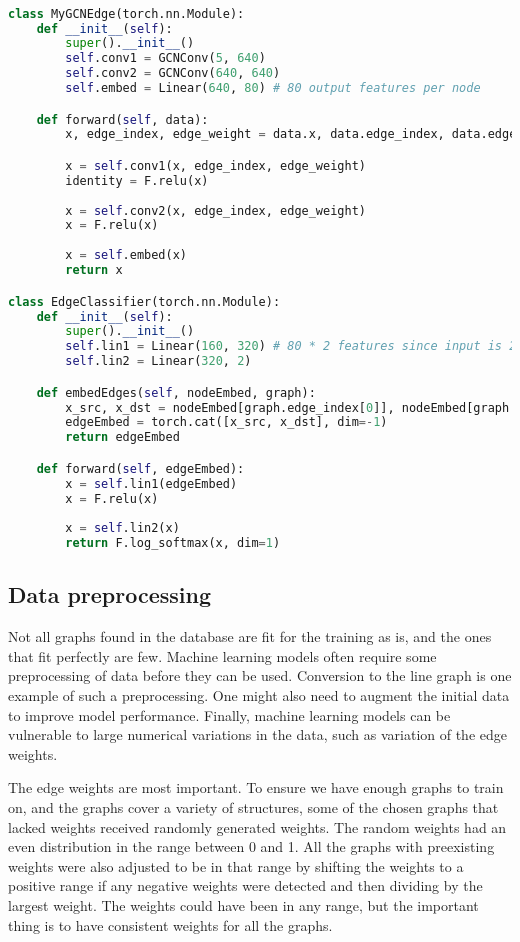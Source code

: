 \begin{lstlisting}[caption={Pytorch GCN for the edge classification}, label={Pytorch GCN for the edge prediction}, language=Python]

class MyGCNEdge(torch.nn.Module):
    def __init__(self):
        super().__init__()
        self.conv1 = GCNConv(5, 640)
        self.conv2 = GCNConv(640, 640)
        self.embed = Linear(640, 80) # 80 output features per node

    def forward(self, data):        
        x, edge_index, edge_weight = data.x, data.edge_index, data.edge_weight

        x = self.conv1(x, edge_index, edge_weight)
        identity = F.relu(x)
        
        x = self.conv2(x, edge_index, edge_weight)
        x = F.relu(x)
        
        x = self.embed(x)
        return x

class EdgeClassifier(torch.nn.Module):
    def __init__(self):
        super().__init__()
        self.lin1 = Linear(160, 320) # 80 * 2 features since input is 2 nodes.
        self.lin2 = Linear(320, 2)

    def embedEdges(self, nodeEmbed, graph):
        x_src, x_dst = nodeEmbed[graph.edge_index[0]], nodeEmbed[graph.edge_index[1]]
        edgeEmbed = torch.cat([x_src, x_dst], dim=-1)        
        return edgeEmbed

    def forward(self, edgeEmbed):        
        x = self.lin1(edgeEmbed)
        x = F.relu(x)
        
        x = self.lin2(x)
        return F.log_softmax(x, dim=1)

\end{lstlisting}

\subsection{Data preprocessing}
\label{sec:preprocessing}
Not all graphs found in the database are fit for the training as is, and the ones that fit perfectly are few. Machine learning models often require some preprocessing of data before they can be used. Conversion to the line graph is one example of such a preprocessing. One might also need to augment the initial data to improve model performance. Finally, machine learning models can be vulnerable to large numerical variations in the data, such as variation of the edge weights.

The edge weights are most important. To ensure we have enough graphs to train on, and the graphs cover a variety of structures, some of the chosen graphs that lacked weights received randomly generated weights. The random weights had an even distribution in the range between 0 and 1. All the graphs with preexisting weights were also adjusted to be in that range by shifting the weights to a positive range if any negative weights were detected and then dividing by the largest weight. The weights could have been in any range, but the important thing is to have consistent weights for all the graphs. 

